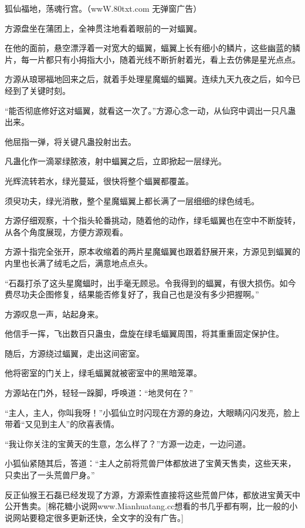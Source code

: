 
\begin{this_body}

狐仙福地，荡魂行宫。（wwW.80txt.com 无弹窗广告）

方源盘坐在蒲团上，全神贯注地看着眼前的一对蝠翼。

在他的面前，悬空漂浮着一对宽大的蝠翼，蝠翼上长有细小的鳞片，这些幽蓝的鳞片，每一片都只有小拇指大小，随着光线不断折射着光，看上去仿佛是星光点点。

方源从琅琊福地回来之后，就着手处理星魔蝠的蝠翼。连续九天九夜之后，如今已经到了关键时刻。

“能否彻底修好这对蝠翼，就看这一次了。”方源心念一动，从仙窍中调出一只凡蛊出来。

他屈指一弹，将关键凡蛊投射出去。

凡蛊化作一滴翠绿脓液，射中蝠翼之后，立即掀起一层绿光。

光辉流转若水，绿光蔓延，很快将整个蝠翼都覆盖。

须臾功夫，绿光消散，整个星魔蝠翼上都长满了一层细细的绿色绒毛。

方源仔细观察，十个指头轮番挑动，随着他的动作，绿毛蝠翼也在空中不断旋转，从各个角度展现，方便方源观看。

方源十指完全张开，原本收缩着的两片星魔蝠翼也跟着舒展开来，方源见到蝠翼的内里也长满了绒毛之后，满意地点点头。

“石磊打杀了这头星魔蝠时，出手毫无顾忌。令我得到的蝠翼，有很大损伤。如今费尽功夫企图修复，结果能否修复好了，我自己也是没有多少把握啊。”

方源叹息一声，站起身来。

他信手一挥，飞出数百只蛊虫，盘旋在绿毛蝠翼周围，将其重重固定保护住。

随后，方源绕过蝠翼，走出这间密室。

他将密室的门关上，绿毛蝠翼就被密室中的黑暗笼罩。

方源站在门外，轻轻一跺脚，呼唤道：“地灵何在？”

“主人，主人，你叫我呀！”小狐仙立时闪现在方源的身边，大眼睛闪闪发亮，脸上带着“又见到主人”的欣喜表情。

“我让你关注的宝黄天的生意，怎么样了？”方源一边走，一边问道。

小狐仙紧随其后，答道：“主人之前将荒兽尸体都放进了宝黄天售卖，这些天来，只卖出了一头荒兽尸身。”

反正仙猴王石磊已经发现了方源，方源索性直接将这些荒兽尸体，都放进宝黄天中公开售卖。[棉花糖小说网www.Mianhuatang.cc想看的书几乎都有啊，比一般的小说网站要稳定很多更新还快，全文字的没有广告。]


\end{this_body}
